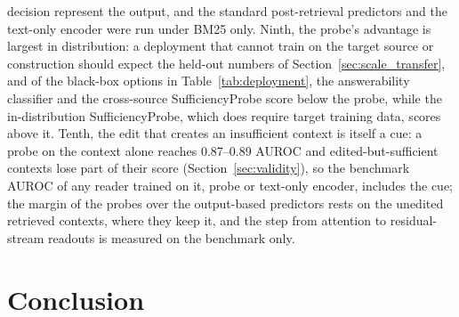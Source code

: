 \documentclass[acmsmall,screen,review]{acmart}
\newcommand{\sprobe}{SufficiencyProbe}
\begin{document}
decision represent the output, and the standard post-retrieval predictors and the text-only encoder were run under BM25 only. Ninth, the probe's advantage is largest in distribution: a deployment that cannot train on the target source or construction should expect the held-out numbers of Section~\ref{sec:scale_transfer}, and of the black-box options in Table~\ref{tab:deployment}, the answerability classifier and the cross-source \sprobe{} score below the probe, while the in-distribution \sprobe{}, which does require target training data, scores above it. Tenth, the edit that creates an insufficient context is itself a cue: a probe on the context alone reaches 0.87--0.89 AUROC and edited-but-sufficient contexts lose part of their score (Section~\ref{sec:validity}), so the benchmark AUROC of any reader trained on it, probe or text-only encoder, includes the cue; the margin of the probes over the output-based predictors rests on the unedited retrieved contexts, where they keep it, and the step from attention to residual-stream readouts is measured on the benchmark only.

\section{Conclusion}
\label{sec:conclusion}
\end{document}
